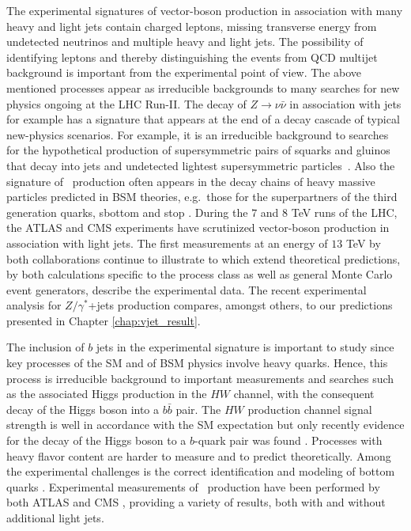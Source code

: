 The experimental signatures of vector-boson production in association
with many heavy and light jets contain charged leptons, missing
transverse energy from undetected neutrinos and multiple heavy and light jets. The possibility of identifying leptons and thereby
distinguishing the events from QCD multijet background is important from the experimental point of view. The above mentioned processes appear as irreducible backgrounds to many searches for new physics ongoing at the LHC Run-II. The decay of $Z\rightarrow
\nu\bar{\nu}$ in association with jets for example has a signature
that appears at the end of a decay cascade of typical new-physics
scenarios. For example, it is an irreducible background to searches for the hypothetical production of
supersymmetric pairs of squarks and gluinos that decay into jets and
undetected lightest supersymmetric
particles~\cite{Collaboration:2011ida,Aad:2011ib,Chatrchyan:2014lfa,Aad:2014wea,Khachatryan:2016kdk,Aaboud:2017vwy}. Also the signature of \Wbb~production often appears in the
decay chains of heavy massive particles predicted in BSM theories, e.g.\ those for the superpartners of the
third generation quarks, sbottom and stop \cite{ATLASCollaboration2015,ATLAS13sbottom16,ATLAS13sbottom17}. During the $7$ and $8$
  TeV runs of the LHC, the ATLAS \cite{Aad:2012en,Aad:2011qv,Aad:2010ab,Aad:2011xn,ATLASRatioWZ14,Aad:2014qxa,ATLAS7Zjets13,ATLAS:ratio2017}
and CMS
\cite{Khachatryan:2014uva,Chatrchyan:2011ne,Chatrchyan:2013tna,CMS7Zjets15,Khachatryan:2016fue,Khachatryan:2015ira,CMS8Zjets16}
experiments have scrutinized vector-boson production in association
with light jets. The first measurements at an
energy of $13$ TeV by both
collaborations \cite{Aaboud:2017hbk,Sirunyan:2017wgx} continue to illustrate
to which extend theoretical predictions, by both calculations specific
to the process class as well as general Monte Carlo event generators, describe
the experimental data. The recent experimental
analysis for $Z/\gamma^*$+jets production \cite{Aaboud:2017hbk}
compares, amongst others, to our predictions \cite{Anger:2017nkq} presented in Chapter
\ref{chap:vjet_result}. 

The inclusion of $b$ jets in the experimental signature is important to
study since key processes of the SM and of BSM physics involve heavy quarks. Hence, this process is irreducible
background to important measurements and searches such as the associated Higgs production in the $HW$ channel, with the consequent decay of
the Higgs boson into a $b\bar{b}$ pair. The $HW$ production
channel signal strength is well in accordance with the SM expectation
\cite{ATLAS2015Higgs} but only recently evidence for the
decay of the Higgs boson to a $b$-quark pair was found
\cite{ATLAS:hbb2017}. Processes with heavy
flavor content are harder to measure and to predict
theoretically. Among the experimental challenges is the correct
identification and modeling of bottom quarks \cite{ATLASbtag}. Experimental measurements of \Wbb~production have been performed by
both ATLAS \cite{Aad:2013vka} and CMS \cite{CMS:2016bb,Chatrchyan:2013uza},
providing a variety of results, both with and without additional light
jets.

